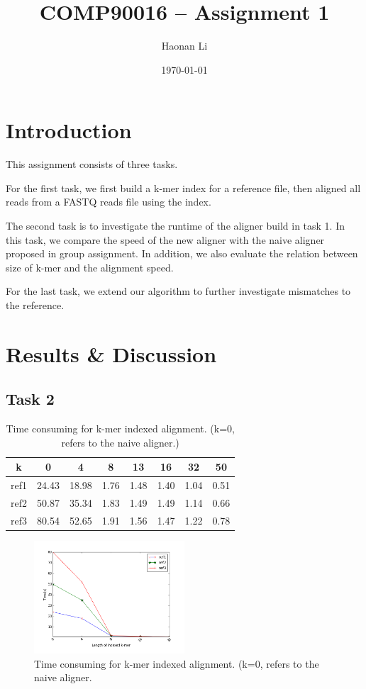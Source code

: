 \documentclass[a4paper]{article}
\title{\bfseries{COMP90016 -- Assignment 1 }}
\author{Haonan Li}
\date{\today}
\begin{document}
\maketitle

\section{Introduction}
\label{sec:introduction}

This assignment consists of three tasks. 

For the first task, we first build a k-mer index for a reference file, then aligned all reads from a FASTQ reads file using the index.

The second task is to investigate the runtime of the aligner build in task 1. In this task, we compare the speed of the new aligner with the naive aligner proposed in group assignment. In addition, we also evaluate the relation between size of k-mer and the alignment speed.

For the last task, we extend our algorithm to further investigate mismatches to the reference.

\section{Results \& Discussion}
\label{sec:experiment}
\subsection{Task 2}

\begin{table}[H]
	\centering
	\begin{tabular}{c|c|c|c|c|c|c|c}
		\hline
		k & 0 & 4 & 8 & 13 & 16 & 32 & 50 \\
		\hline
		ref1 & 24.43 & 18.98 & 1.76 & 1.48 & 1.40 & 1.04 & 0.51 \\
		\hline
		ref2 & 50.87 & 35.34 & 1.83 & 1.49 & 1.49 & 1.14 & 0.66 \\
		\hline
		ref3 & 80.54 & 52.65 & 1.91 & 1.56 & 1.47 & 1.22 & 0.78\\
		\hline
	\end{tabular}
	\caption{\label{tab:1}Time consuming for k-mer indexed alignment. (k=0, refers to  the naive aligner.)}
\end{table}

\begin{figure}[!htb]
	\centering
		\includegraphics[width=0.5\textwidth]{align_time.png}
	\caption{\label{fig:1}Time consuming for k-mer indexed alignment. (k=0, refers to  the naive aligner.}
\end{figure}
\end{document}
